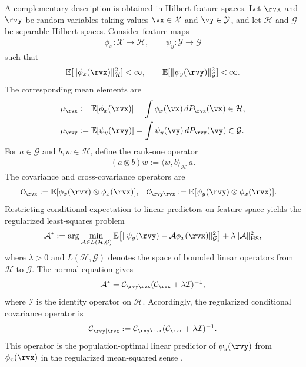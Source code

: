 \documentclass[twoside,11pt]{article}
\begin{document}
A complementary description is obtained in Hilbert feature spaces. Let $\rvx$ and $\rvy$ be random variables taking values $\vx \in \mathcal X$ and $\vy \in \mathcal Y$, and let $\mathcal H$ and $\mathcal G$ be separable Hilbert spaces. Consider feature maps
\begin{align}
\phi_x:\mathcal X\to\mathcal H,
\qquad
\psi_y:\mathcal Y\to\mathcal G
\label{eq:feature_maps}
\end{align}
such that
\begin{align}
\mathbb E[\|\phi_x(\rvx)\|_{\mathcal H}^2] < \infty,
\qquad
\mathbb E[\|\psi_y(\rvy)\|_{\mathcal G}^2] < \infty.
\label{eq:feature_square_integrable}
\end{align}
The corresponding mean elements are
\begin{align}
\mu_{\rvx}
&:=
\mathbb E[\phi_x(\rvx)]
=
\int \phi_x(\vx)\,dP_{\rvx}(\vx)
\in\mathcal H,
\nonumber\\
\mu_{\rvy}
&:=
\mathbb E[\psi_y(\rvy)]
=
\int \psi_y(\vy)\,dP_{\rvy}(\vy)
\in\mathcal G.
\label{eq:mean_elements}
\end{align}
For $a\in\mathcal G$ and $b,w\in\mathcal H$, define the rank-one operator
\begin{align}
(a\otimes b)w
:=
\langle w,b\rangle_{\mathcal H}\,a.
\label{eq:rank_one_operator}
\end{align}
The covariance and cross-covariance operators are
\begin{align}
\mathcal C_{\rvx}
&:=
\mathbb E[\phi_x(\rvx)\otimes \phi_x(\rvx)],
&
\mathcal C_{\rvy\rvx}
&:=
\mathbb E[\psi_y(\rvy)\otimes \phi_x(\rvx)].
\label{eq:covariance_crosscovariance}
\end{align}
Restricting conditional expectation to linear predictors on feature space yields the regularized least-squares problem
\begin{align}
\mathcal A^\ast
:=
\arg\min_{\mathcal A\in L(\mathcal H,\mathcal G)}
\mathbb E
\!\left[
\|\psi_y(\rvy)-\mathcal A \phi_x(\rvx)\|_{\mathcal G}^2
\right]
+
\lambda \|\mathcal A\|_{\mathrm{HS}}^2,
\label{eq:conditional_operator_regression}
\end{align}
where $\lambda>0$ and $L(\mathcal H,\mathcal G)$ denotes the space of bounded linear operators from $\mathcal H$ to $\mathcal G$. The normal equation gives
\begin{align}
\mathcal A^\ast
=
\mathcal C_{\rvy\rvx}
(\mathcal C_{\rvx}+\lambda \mathcal I)^{-1},
\label{eq:conditional_operator_solution}
\end{align}
where $\mathcal I$ is the identity operator on $\mathcal H$. Accordingly, the regularized conditional covariance operator is
\begin{align}
\mathcal C_{\rvy\mid \rvx}
:=
\mathcal C_{\rvy\rvx}
(\mathcal C_{\rvx}+\lambda \mathcal I)^{-1}.
\label{eq:conditional_covariance_operator}
\end{align}
This operator is the population-optimal linear predictor of $\psi_y(\rvy)$ from $\phi_x(\rvx)$ in the regularized mean-squared sense \citep{Fukumizu2004,Hsing2015,Song2009}.
\end{document}
